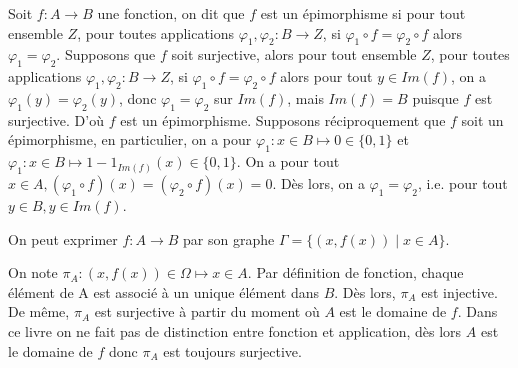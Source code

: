 \begin{exercice}
    Soit $f : A \to B$ une fonction, on dit que $f$ est un épimorphisme si pour tout ensemble $Z$, pour toutes applications $\varphi_1, \varphi_2 : B \to Z$,
    si $\varphi_1 \circ f = \varphi_2 \circ f$ alors $\varphi_1 = \varphi_2$.
    Supposons que $f$ soit surjective, alors pour tout ensemble $Z$, pour toutes applications $\varphi_1, \varphi_2 : B \to Z$, si $\varphi_1 \circ f = \varphi_2 \circ f$ alors 
    pour tout $y \in Im(f)$, on a $\varphi_1(y) = \varphi_2(y)$, donc $\varphi_1 = \varphi_2$ sur $Im(f)$, mais $Im(f) = B$ puisque $f$ est surjective. D'où $f$ est un épimorphisme. 
    Supposons réciproquement que $f$ soit un épimorphisme, en particulier, on a pour $\varphi_1 : x \in B \mapsto 0 \in \{0, 1\}$ et $\varphi_1 : x \in B \mapsto 1 - 1_{Im(f)}(x) \in \{0, 1\}$.
    On a pour tout $x \in A, (\varphi_1 \circ f)(x) = (\varphi_2 \circ f)(x) = 0$. Dès lors, on a $\varphi_1 = \varphi_2$, i.e. pour tout $y\in B, y \in Im(f)$.
\end{exercice}

\begin{exercice}
    On peut exprimer $f : A \to B$ par son graphe $\Gamma = \{(x, f(x)) \mid x \in A\}$.
    \begin{figure}[h]
        \centering
    \end{figure}
\end{exercice}

\begin{exercice}
    On note $\pi_A : (x, f(x)) \in \Omega \mapsto x \in A$. Par définition de fonction, chaque élément de A est 
    associé à un unique élément dans $B$. Dès lors, $\pi_A$ est injective. De même, $\pi_A$ est surjective à partir 
    du moment où $A$ est le domaine de $f$. Dans ce livre on ne fait pas de distinction entre fonction et application, 
    dès lors $A$ est le domaine de $f$ donc $\pi_A$ est toujours surjective.
\end{exercice}

